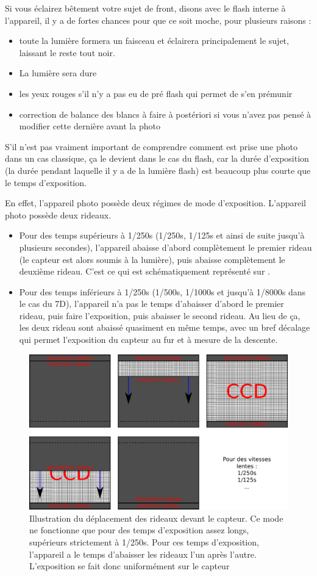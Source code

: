 \documentclass[a4paper,twoside]{article}
\begin{document}
Si vous éclairez bêtement votre sujet de front, disons avec le flash interne à l'appareil, il y a de fortes chances pour que ce soit moche, pour plusieurs raisons : 
\begin{itemize}
\item toute la lumière formera un faisceau et éclairera principalement le sujet, laissant le reste tout noir.
\item La lumière sera dure
\item les yeux rouges s'il n'y a pas eu de pré flash qui permet de s'en prémunir
\item correction de balance des blancs à faire à postériori si vous n'avez pas pensé à modifier cette dernière avant la photo
\end{itemize}

S'il n'est pas vraiment important de comprendre comment est prise une photo dans un cas classique, ça le devient dans le cas du flash, car la durée d'exposition (la durée pendant laquelle il y a de la lumière flash) est beaucoup plus courte que le temps d'exposition. 

En effet, l'appareil photo possède deux régimes de mode d'exposition. L'appareil photo possède deux rideaux. 
\begin{itemize}
\item Pour des temps supérieurs à 1/250s (1/250s, 1/125s et ainsi de suite jusqu'à plusieurs secondes), l'appareil abaisse d'abord complètement le premier rideau (le capteur est alors soumis à la lumière), puis abaisse complètement le deuxième rideau. C'est ce qui est schématiquement représenté sur .
\item Pour des temps inférieurs à 1/250s (1/500s, 1/1000s et jusqu'à 1/8000s dans le cas du 7D), l'appareil n'a pas le temps d'abaisser d'abord le premier rideau, puis faire l'exposition, puis abaisser le second rideau. Au lieu de ça, les deux rideau sont abaissé quasiment en même temps, avec un bref décalage qui permet l'exposition du capteur au fur et à mesure de la descente.
\end{itemize}

\begin{figure}[htb]
\centering
\includegraphics[width=0.45\linewidth]{figure/first_second_curtain_slow.pdf}
\caption{Illustration du déplacement des rideaux devant le capteur. Ce mode ne fonctionne que pour des temps d'exposition assez longs, supérieurs strictement à 1/250s. Pour ces temps d'exposition, l'appareil a le temps d'abaisser les rideaux l'un après l'autre. L'exposition se fait donc uniformément sur le capteur}\label{fig:curtain_slow}
\end{figure}
\end{document}
